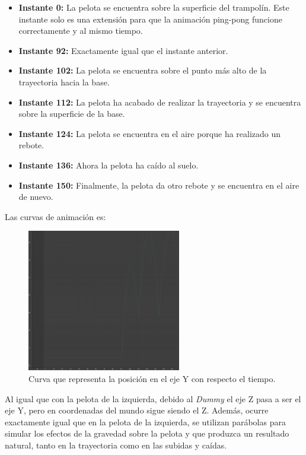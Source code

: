 \documentclass{article}
\begin{document}
\begin{itemize}
    \item \textbf{Instante 0: }La pelota se encuentra sobre la superficie del trampolín. Este instante solo es una extensión para que la animación ping-pong funcione correctamente y al mismo tiempo.
    \item \textbf{Instante 92: }Exactamente igual que el instante anterior.
    \item \textbf{Instante 102: }La pelota se encuentra sobre el punto más alto de la trayectoria hacia la base.
    \item \textbf{Instante 112: }La pelota ha acabado de realizar la trayectoria y se encuentra sobre la superficie de la base.
    \item \textbf{Instante 124: }La pelota se encuentra en el aire porque ha realizado un rebote.
    \item \textbf{Instante 136: }Ahora la pelota ha caído al suelo.
    \item \textbf{Instante 150: }Finalmente, la pelota da otro rebote y se encuentra en el aire de nuevo.
\end{itemize}

\newpage

Las curvas de animación es:

\begin{figure}[H]
    \centering
    \includegraphics[width=0.6\textwidth]{imagenes/curvas/PR/pelota/green.png}
    \caption{Curva que representa la posición en el eje Y con respecto el tiempo.}
 \end{figure}

 Al igual que con la pelota de la izquierda, debido al \textit{Dummy} el eje Z pasa a ser el eje Y, pero en coordenadas del mundo sigue siendo el Z. Además, ocurre exactamente igual que en la pelota de la izquierda, se utilizan parábolas para simular los efectos de la gravedad sobre la pelota y que produzca un resultado natural, tanto en la trayectoria como en las subidas y caídas.
\end{document}
